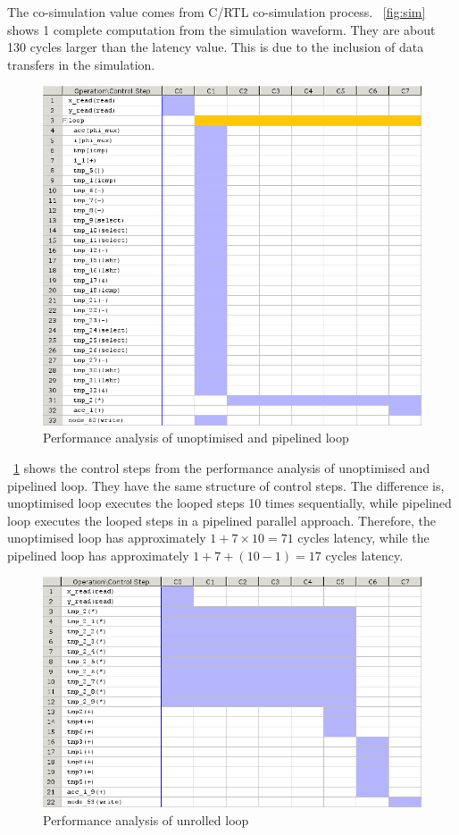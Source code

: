 \documentclass[journal]{IEEEtran}
\newcommand{\fref}[1]{\figurename~\ref{#1}}
\begin{document}
The co-simulation value comes from C/RTL co-simulation process. \fref{fig:sim} shows 1 complete computation from the simulation waveform. They are about 130 cycles larger than the latency value. This is due to the inclusion of data transfers in the simulation.

\begin{figure}[!ht]
	\centering
	\includegraphics[width=\columnwidth]{none}
	\caption{Performance analysis of unoptimised and pipelined loop}
	\label{fig:none}
\end{figure}

\fref{fig:none} shows the control steps from the performance analysis of unoptimised and pipelined loop. They have the same structure of control steps. The difference is, unoptimised loop executes the looped steps 10 times sequentially, while pipelined loop executes the looped steps in a pipelined parallel approach. Therefore, the unoptimised loop has approximately $1 + 7 \times 10 = 71$ cycles latency, while the pipelined loop has approximately $1 + 7 + (10 - 1) = 17$ cycles latency.

\begin{figure}[!ht]
	\centering
	\includegraphics[width=\columnwidth]{unroll}
	\caption{Performance analysis of unrolled loop}
	\label{fig:unroll}
\end{figure}
\end{document}
